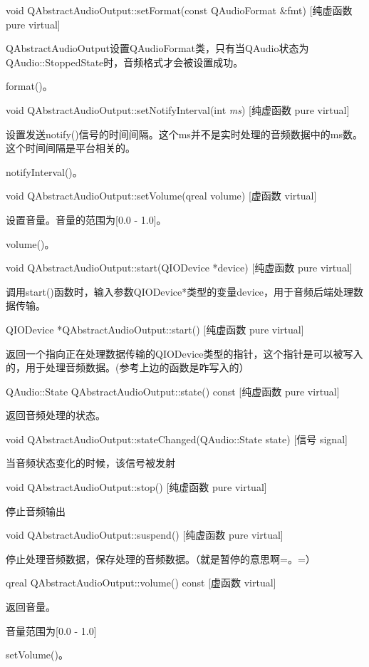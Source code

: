 void QAbstractAudioOutput::setFormat(const QAudioFormat \&fmt) [纯虚函数 pure virtual] 

QAbstractAudioOutput设置QAudioFormat类，只有当QAudio状态为QAudio::StoppedState时，音频格式才会被设置成功。

\begin{seeAlso}
format()。
\end{seeAlso}

void QAbstractAudioOutput::setNotifyInterval(int \emph{ms}) [纯虚函数 pure virtual] 

设置发送notify()信号的时间间隔。这个ms并不是实时处理的音频数据中的ms数。
这个时间间隔是平台相关的。

\begin{seeAlso}
notifyInterval()。
\end{seeAlso}

void QAbstractAudioOutput::setVolume(qreal volume) [虚函数 virtual] 

设置音量。音量的范围为[0.0 - 1.0]。 

\begin{seeAlso}
volume()。
\end{seeAlso}

void QAbstractAudioOutput::start(QIODevice *device) [纯虚函数 pure virtual] 

调用start()函数时，输入参数QIODevice*类型的变量device，用于音频后端处理数据传输。

QIODevice *QAbstractAudioOutput::start() [纯虚函数 pure virtual] 

返回一个指向正在处理数据传输的QIODevice类型的指针，这个指针是可以被写入的，用于处理音频数据。(参考上边的函数是咋写入的）

QAudio::State QAbstractAudioOutput::state() const [纯虚函数 pure
virtual] 

返回音频处理的状态。

void QAbstractAudioOutput::stateChanged(QAudio::State state) [信号
signal] 

当音频状态变化的时候，该信号被发射

void QAbstractAudioOutput::stop() [纯虚函数 pure virtual] 

停止音频输出

void QAbstractAudioOutput::suspend() [纯虚函数 pure virtual] 

停止处理音频数据，保存处理的音频数据。（就是暂停的意思啊=。=）

qreal QAbstractAudioOutput::volume() const [虚函数 virtual] 

返回音量。

音量范围为[0.0 - 1.0] 

\begin{seeAlso}
setVolume()。
\end{seeAlso}